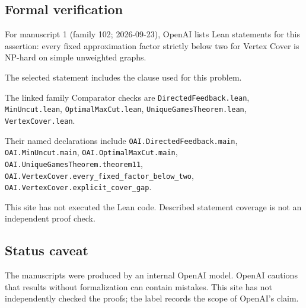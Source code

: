 \documentclass[11pt]{article}
\begin{document}
\subsection{Formal verification}
For manuscript 1 (family 102; 2026-09-23), OpenAI lists Lean statements for this assertion: every fixed approximation factor strictly below two for Vertex Cover is NP-hard on simple unweighted graphs.

The selected statement includes the clause used for this problem.

The linked family Comparator checks are \texttt{DirectedFeedback.lean}, \texttt{MinUncut.lean}, \texttt{OptimalMaxCut.lean}, \texttt{UniqueGamesTheorem.lean}, \texttt{VertexCover.lean}.

Their named declarations include \texttt{OAI.DirectedFeedback.main}, \texttt{OAI.MinUncut.main}, \texttt{OAI.OptimalMaxCut.main}, \texttt{OAI.UniqueGamesTheorem.theorem11}, \texttt{OAI.VertexCover.every\_fixed\_factor\_below\_two}, \texttt{OAI.VertexCover.explicit\_cover\_gap}.

This site has not executed the Lean code. Described statement coverage is not an independent proof check.

\subsection{Status caveat}
The manuscripts were produced by an internal OpenAI model. OpenAI cautions that results without formalization can contain mistakes. This site has not independently checked the proofs; the label records the scope of OpenAI's claim.
\end{document}
